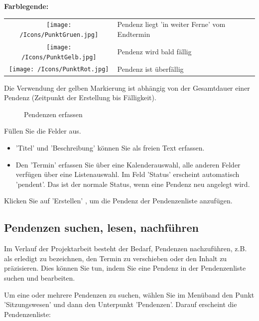 \textbf{Farblegende:}

\begin{tabular}{c p{14cm} l} %
\texttt{[image: /Icons/PunktGruen.jpg]} & Pendenz liegt 'in weiter Ferne' vom Endtermin \\
\texttt{[image: /Icons/PunktGelb.jpg]} & Pendenz wird bald fällig \\
\texttt{[image: /Icons/PunktRot.jpg]} & Pendenz ist überfällig \\
\end{tabular}

\vspace{\baselineskip}

Die Verwendung der gelben Markierung ist abhängig von der Gesamtdauer einer Pendenz (Zeitpunkt der Erstellung bis Fälligkeit).

\begin{figure}[H]
\caption{Pendenzen erfassen}
\end{figure}

Füllen Sie die Felder aus.

\begin{itemize}
\item
'Titel'  und 'Beschreibung'  können Sie als freien Text erfassen.
\item
Den 'Termin'  erfassen Sie über eine Kalenderauswahl, alle anderen Felder  verfügen über eine Listenauswahl. Im Feld 'Status' erscheint automatisch 'pendent'. Das ist der normale Status, wenn eine Pendenz neu angelegt wird.
\end{itemize}
Klicken Sie auf 'Erstellen' , um die Pendenz der Pendenzenliste anzufügen.

\subsection{Pendenzen suchen, lesen, nachführen}
Im Verlauf der Projektarbeit besteht der Bedarf, Pendenzen nachzuführen, z.B. als erledigt zu bezeichnen, den Termin zu verschieben oder den Inhalt zu präzisieren. Dies können Sie tun, indem Sie eine Pendenz in der Pendenzenliste suchen und bearbeiten.

\vspace{\baselineskip}

Um eine oder mehrere Pendenzen zu suchen, wählen Sie im Menüband den Punkt 'Sitzungswesen' und dann den Unterpunkt 'Pendenzen'. Darauf erscheint die Pendenzenliste:

